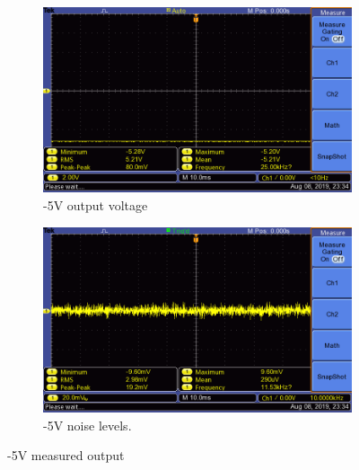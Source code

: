 \begin{figure}[h]
 \centering
 
    \begin{subfigure}[]{0.49\linewidth}
        \centering
        \includegraphics[width=1.\linewidth,clip, trim = 0cm 0cm 2.5cm 0cm]{./Figures/-5v_test}
        \caption{-5V output voltage}
        \label{fig:-5v_output_measurement}
    \end{subfigure}
    \begin{subfigure}[]{0.49\linewidth}
        \centering
        \includegraphics[width=1.\linewidth,clip, trim = 0cm 0cm 2.5cm 0cm]{./Figures/-5v_noise_test}
        \caption{-5V noise levels.}
        \label{fig:-5v_noise_measurement}
    \end{subfigure}
    
\caption{-5V measured output}
\label{fig:-5v_measurement_box}
\end{figure}










